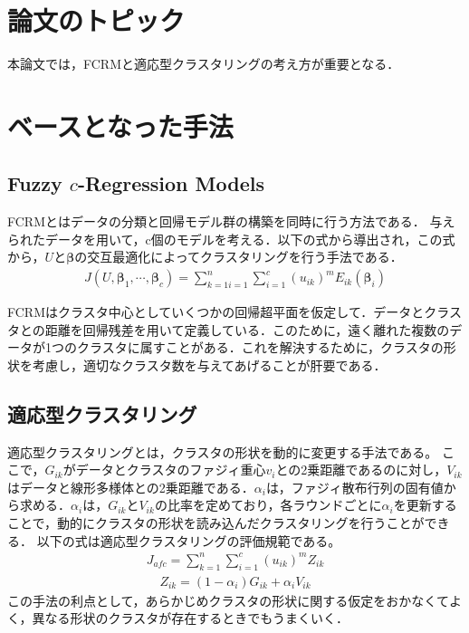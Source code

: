 \documentclass[10pt,onecolumn]{jsarticle}
\begin{document}
\section{論文のトピック}
本論文では，FCRMと適応型クラスタリングの考え方が重要となる．

\section{ベースとなった手法}

\subsection{Fuzzy $c$-Regression Models}
FCRMとはデータの分類と回帰モデル群の構築を同時に行う方法である．
与えられたデータを用いて，c個のモデルを考える．以下の式から導出され，この式から，$U$と$\bm{\beta}$の交互最適化によってクラスタリングを行う手法である．
\begin{align}
	\label{conditional_probability}
	J\left(U, \boldsymbol{\beta}_{1}, \cdots, \boldsymbol{\beta}_{c}\right)=\sum_{k=1 i=1}^{n} \sum_{i=1}^{c}\left(u_{i k}\right)^{m} E_{i k}\left(\boldsymbol{\beta}_{i}\right)
\end{align}

FCRMはクラスタ中心としていくつかの回帰超平面を仮定して．データとクラスタとの距離を回帰残差を用いて定義している．このために，遠く離れた複数のデータが1つのクラスタに属すことがある．これを解決するために，クラスタの形状を考慮し，適切なクラスタ数を与えてあげることが肝要である．

\subsection{適応型クラスタリング}
適応型クラスタリングとは，クラスタの形状を動的に変更する手法である。
ここで，$G_{ik}$がデータとクラスタのファジィ重心$v_i$との2乗距離であるのに対し，$V_{ik}$はデータと線形多様体との2乗距離である．$\alpha_{i}$は，ファジィ散布行列の固有値から求める．$\alpha_{i}$は，$G_{ik}$と$V_{ik}$の比率を定めており，各ラウンドごとに$\alpha_{i}$を更新することで，動的にクラスタの形状を読み込んだクラスタリングを行うことができる．
以下の式は適応型クラスタリングの評価規範である。
\begin{align}
	J_{a f c}=\sum_{k=1}^{n} \sum_{i=1}^{c}\left(u_{i k}\right)^{m} Z_{i k}
\end{align}
\begin{align}
	Z_{i k}=\left(1-\alpha_{i}\right) G_{i k}+\alpha_{i} V_{i k}
\end{align}
この手法の利点として，あらかじめクラスタの形状に関する仮定をおかなくてよく，異なる形状のクラスタが存在するときでもうまくいく．
\end{document}
